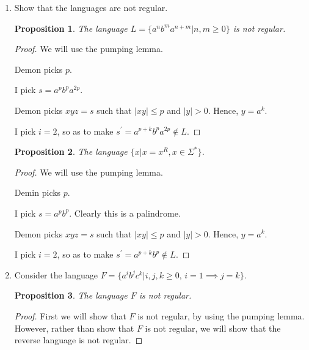 \documentclass{article}
\newtheorem{proposition}{Proposition}
\begin{document}
\begin{enumerate}
    \item Show that the languages are not regular.

        \begin{proposition}
            The language $L = \{a^n b^m a^{n + m} | n, m \geq 0\}$ is not
            regular.
        \end{proposition}

        \begin{proof}
            We will use the pumping lemma.

            Demon picks $p$.

            I pick  $s = a^p b^p a^{2p}$.

            Demon picks $xyz = s$ such that $|xy| \leq p$ and $|y| > 0$.
            Hence, $y = a^k$.

            I pick $i = 2$, so as to make 
            $s^\prime = a^{p + k} b^p a^{2p} \notin L$.
        \end{proof}

        \begin{proposition}
            The language $\{x | x = x^R, x \in \Sigma^*\}$.
        \end{proposition}

        \begin{proof}
            We will use the pumping lemma.

            Demin picks $p$.

            I pick $s = a^p b^p$. Clearly this is a palindrome.

            Demon picks $xyz = s$ such that $|xy| \leq p$ and $|y| > 0$.
            Hence, $y = a^k$.

            I pick $i = 2$, so as to make
            $s^\prime = a^{p + k} b^p \notin L$.
        \end{proof}

    \item
        Consider the language 
        $F = \{a^i b^j c^k | i, j, k \geq 0,\, i = 1 \implies j = k\}$.

        \begin{proposition}
            The language $F$ is not regular.
        \end{proposition}

        \begin{proof}
            First we will show that $F$ is not regular, by using the pumping
            lemma. However, rather than show that $F$ is not regular, we will
            show that the reverse language is not regular.


\end{proof}
\end{enumerate}
\end{document}
